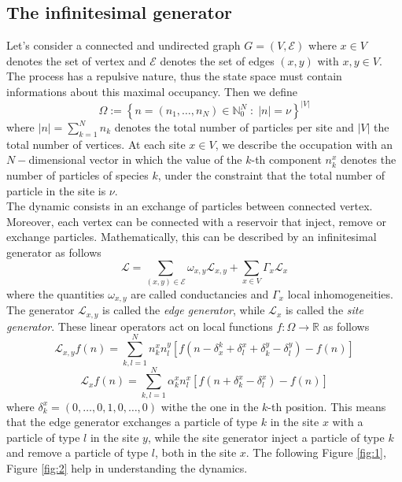 \documentclass[11pt]{article}
\numberwithin{equation}{section}
\newcommand{\twoj}{\nu}
\begin{document}
\subsection{The infinitesimal generator}
Let's consider a connected and undirected graph $G=(V,\mathcal{E})$ where $x\in V$ denotes the set of vertex and $\mathcal{E}$ denotes the set of edges $(x,y)$ with $x,y\in V$.  The process has a repulsive nature, thus the state space must contain informations about this maximal occupancy. Then we define 
\begin{equation}\label{stateSpace}
    \Omega:=\left\{n=(n_{1},\ldots,n_{N})\in\mathbb{N}_0^{N}\;:\; |n|=\twoj\right\}^{|V|}
\end{equation}
where $|n|=\sum_{k=1}^{N}n_{k}$ denotes the total number of particles per site and $|V|$  the total number of vertices. At each site $x\in V$, we describe the occupation with an $N-$dimensional vector in which the value of the $k$-th component $n_{k}^{x}$ denotes the number of particles of species $k$, under the constraint that the total number of particle in the site is $\twoj$. \\
The dynamic consists in an exchange of particles between connected vertex. Moreover, each vertex can be connected with a reservoir that inject, remove or exchange particles. Mathematically, this can be described by an infinitesimal generator as follows
\begin{equation}\label{Generator}
    \mathcal{L}=\sum_{(x,y)\in \mathcal{E}}\omega_{x,y}\mathcal{L}_{x,y}+\sum_{x\in V}\Gamma_{x}\mathcal{L}_{x}
\end{equation}
where the quantities $ \omega_{x,y}$ are called conductancies and $\Gamma_{x}$ local inhomogeneities. The generator $\mathcal{L}_{x,y}$ is called the \textit{edge generator}, while $\mathcal{L}_{x}$ is called the \textit{site generator}. These linear operators act on local functions $f:\Omega\to \mathbb{R}$ as follows
\begin{equation}
\mathcal{L}_{x,y}f(n)=\sum_{k,l=1}^{N}n_{k}^{x}n_{l}^{y}\left[f(n-\delta_{x}^{k}+\delta_{l}^{x}+\delta_{k}^{y}-\delta_{l}^{y})-f(n)\right]
\end{equation}
\begin{equation}
    \mathcal{L}_{x}f(n)=\sum_{k,l=1}^{N}\alpha_{k}^{x}n_{l}^{x}\left[f(n+\delta_{k}^{x}-\delta_{l}^{x})-f(n)\right]
\end{equation}
where 
$\delta_{k}^{x}=(0,\ldots,0,1,0,\ldots,0)$ withe the one in the $k$-th position. This means that the edge generator exchanges a particle of type $k$ in the site $x$ with a particle of type $l$ in the site $y$, while the site generator inject a particle of type $k$ and remove a particle of type $l$, both in the site $x$. The following Figure \ref{fig:1}, Figure \ref{fig:2} help in understanding the dynamics. 
\end{document}
